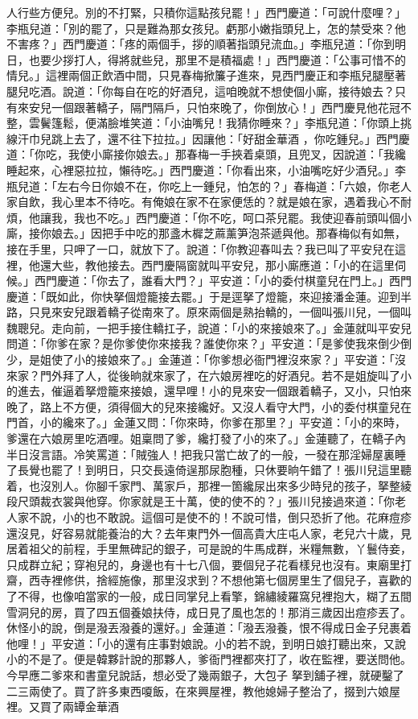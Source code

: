 人行些方便兒。別的不打緊，只積你這點孩兒罷！」西門慶道：「可說什麼哩？」李瓶兒道：「別的罷了，只是難為那女孩兒。虧那小嫩指頭兒上，怎的禁受來？他不害疼？」西門慶道：「疼的兩個手，拶的順著指頭兒流血。」李瓶兒道：「你到明日，也要少拶打人，得將就些兒，那里不是積福處！」西門慶道：「公事可惜不的情兒。」這裡兩個正飲酒中間，只見春梅掀簾子進來，見西門慶正和李瓶兒腿壓著腿兒吃酒。說道：「你每自在吃的好酒兒，這咱晚就不想使個小廝，接待娘去？只有來安兒一個跟著轎子，隔門隔戶，只怕來晚了，你倒放心！」西門慶見他花冠不整，雲鬢篷鬆，便滿臉堆笑道：「小油嘴兒！我猜你睡來？」李瓶兒道：「你頭上挑線汗巾兒跳上去了，還不往下拉拉。」因讓他：「好甜金華酒 ，你吃鍾兒。」西門慶道：「你吃，我使小廝接你娘去。」那春梅一手挾着桌頭，且兜叉，因說道：「我纔睡起來，心裡惡拉拉，懶待吃。」西門慶道：「你看出來，小油嘴吃好少酒兒。」李瓶兒道：「左右今日你娘不在，你吃上一鍾兒，怕怎的？」春梅道：「六娘，你老人家自飲，我心里本不待吃。有俺娘在家不在家便恁的？就是娘在家，遇着我心不耐煩，他讓我，我也不吃。」西門慶道：「你不吃，呵口茶兒罷。我使迎春前頭叫個小廝，接你娘去。」因把手中吃的那盞木樨芝蔴薰笋泡茶遞與他。那春梅似有如無，接在手里，只呷了一口，就放下了。說道：「你教迎春叫去？我已叫了平安兒在這裡，他還大些，教他接去。西門慶隔窗就叫平安兒，那小廝應道：「小的在這里伺候。」西門慶道：「你去了，誰看大門？」平安道：「小的委付棋童兒在門上。」西門慶道：「既如此，你快拏個燈籠接去罷。」于是逕拏了燈籠，來迎接潘金蓮。迎到半路，只見來安兒跟着轎子從南來了。原來兩個是熟抬轎的，一個叫張川兒，一個叫魏聰兒。走向前，一把手接住轎扛子，說道：「小的來接娘來了。」金蓮就叫平安兒問道：「你爹在家？是你爹使你來接我？誰使你來？」平安道：「是爹使我來倒少倒少，是姐使了小的接娘來了。」金蓮道：「你爹想必衙門裡沒來家？」平安道：「沒來家？門外拜了人，從後晌就來家了，在六娘房裡吃的好酒兒。若不是姐旋叫了小的進去，催逼着拏燈籠來接娘，還早哩！小的見來安一個跟着轎子，又小，只怕來晚了，路上不方便，須得個大的兒來接纔好。又沒人看守大門，小的委付棋童兒在門首，小的纔來了。」金蓮又問：「你來時，你爹在那里？」平安道：「小的來時，爹還在六娘房里吃酒哩。姐稟問了爹，纔打發了小的來了。」金蓮聽了，在轎子內半日沒言語。冷笑罵道：「賊強人！把我只當亡故了的一般，一發在那淫婦屋裏睡了長覺也罷了！到明日，只交長遠倚逞那尿胞種，只休要晌午錯了！張川兒這里聽着，也沒別人。你腳千家門、萬家戶，那裡一箇纔尿出來多少時兒的孩子，拏整綾段尺頭裁衣裳與他穿。你家就是王十萬，使的使不的？」張川兒接過來道：「你老人家不說，小的也不敢說。這個可是使不的！不說可惜，倒只恐折了他。花麻痘疹還沒見，好容易就能養治的大？去年東門外一個高貴大庄屯人家，老兒六十歲，見居着祖父的前程，手里無碑記的銀子，可是說的牛馬成群，米糧無數，丫鬟侍妾，只成群立紀；穿袍兒的，身邊也有十七八個，要個兒子花看樣兒也沒有。東廟里打齋，西寺裡修供，捨經施像，那里沒求到？不想他第七個房里生了個兒子，喜歡的了不得，也像咱當家的一般，成日同掌兒上看擎，錦繡綾羅窩兒裡抱大，糊了五間雪洞兒的房，買了四五個養娘扶侍，成日見了風也怎的！那消三歲因出痘疹丟了。休怪小的說，倒是潑丟潑養的還好。」金蓮道：「潑丟潑養，恨不得成日金子兒裹着他哩！」平安道：「小的還有庄事對娘說。小的若不說，到明日娘打聽出來，又說小的不是了。便是韓夥計說的那夥人，爹衙門裡都夾打了，收在監裡，要送問他。今早應二爹來和書童兒說話，想必受了幾兩銀子，大包子 拏到舖子裡，就硬鑿了二三兩使了。買了許多東西嗄飯，在來興屋裡，教他媳婦子整治了，掇到六娘屋裡。又買了兩罈金華酒 